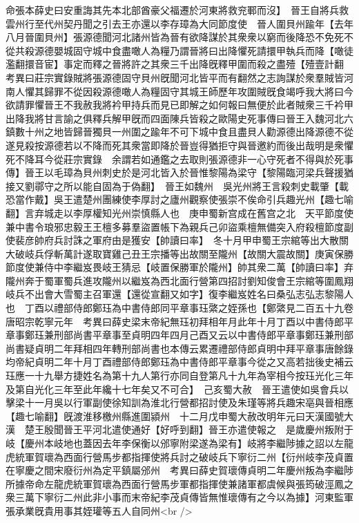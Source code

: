 命張本薛史曰安重誨其先本北部酋豪父福遷於河東將救兖鄆而沒】　晉王自將兵救雲州行至代州契丹聞之引去王亦還以李存璋為大同節度使　晉人圍貝州踰年【去年八月晉圍貝州】張源德聞河北諸州皆為晉有欲降謀於其衆衆以窮而後降恐不免死不從共殺源德嬰城固守城中食盡噉人為糧乃謂晉將曰出降懼死請擐甲執兵而降【噉徒濫翻擐音宦】事定而釋之晉將許之其衆三千出降旣釋甲圍而殺之盡殪【殪壹計翻　考異曰莊宗實錄賊將張源德固守貝州旣聞河北皆平而有翻然之志詢謀於衆羣賊皆河南人懼其歸罪不從因殺源德噉人為糧固守其城王師歷年攻圍賊旣食竭呼我大將曰今欲請罪懼晉王不我赦我將衿甲持兵而見已即解之如何報曰無便於此者賊衆三千衿甲出降我將甘言諭之俱釋兵解甲旣而四面陳兵皆殺之歐陽史死事傳曰晉王入魏河北六鎮數十州之地皆歸晉獨貝一州圍之踰年不可下城中食且盡貝人勸源德出降源德不從遂見殺按源德若以不降而死其衆當即降於晉豈得猶拒守與晉邀約而後出哉明是衆懼死不降耳今從莊宗實錄　余謂若如通鑑之去取則張源德非一心守死者不得與於死事傳】晉王以毛璋為貝州刺史於是河北皆入於晉惟黎陽為梁守【黎陽臨河梁兵聲援猶接又劉鄩守之所以能自固為于偽翻】　晉王如魏州　吳光州將王言殺刺史載肇【載恐當作戴】吳王遣楚州團練使李厚討之廬州觀察使張崇不俟命引兵趣光州【趣七喻翻】言弃城走以李厚權知光州崇慎縣人也　庚申蜀新宫成在舊宫之北　天平節度使兼中書令琅邪忠毅王王檀多募羣盜置帳下為親兵己卯盜乘檀無備突入府殺檀節度副使裴彦帥府兵討誅之軍府由是獲安【帥讀曰率】　冬十月甲申蜀王宗綰等出大散關大破岐兵俘斬萬計遂取寶雞己丑王宗播等出故關至隴州【故關大震故關】庚寅保勝節度使兼侍中李繼岌畏岐王猜忌【岐置保勝軍於隴州】帥其衆二萬【帥讀曰率】弃隴州奔于蜀軍蜀兵進攻隴州以繼岌為西北面行營第四招討劉知俊會王宗綰等圍鳳翔岐兵不出會大雪蜀主召軍還【還從宣翻又如字】復李繼岌姓名曰桑弘志弘志黎陽人也　丁酉以禮部侍郎鄭珏為中書侍郎同平章事珏綮之姪孫也【鄭綮見二百五十九卷唐昭宗乾寧元年　考異曰薛史梁末帝紀無珏初拜相年月此年十月丁酉以中書侍郎平章事鄭珏兼刑部尚書平章事至貞明四年四月己酉又云以中書侍郎平章事鄭珏兼刑部尚書疑貞明二年拜相四年轉刑部尚書也本傳云累遷禮部侍郎貞明中拜平章事唐餘錄均帝紀貞明二年十月丁酉禮部侍郎鄭珏為中書侍郎平章事今從之又高若拙後史補云珏應一十九舉方捷姓名為第十九人第行亦同自登第凡十九年為宰相今按珏光化三年及第自光化三年至此年纔十七年矣又不可合】　己亥蜀大赦　晉王遣使如吳會兵以擊梁十一月吳以行軍副使徐知訓為淮北行營都招討使及朱瑾等將兵趣宋亳與晉相應【趣七喻翻】旣渡淮移檄州縣進圍潁州　十二月戊申蜀大赦改明年元曰天漢國號大漢　楚王殷聞晉王平河北遣使通好【好呼到翻】晉王亦遣使報之　是歲慶州叛附于岐【慶州本岐地也蓋因去年李保衡以邠寧附梁遂為梁有】岐將李繼陟據之詔以左龍虎統軍賀瓌為西面行營馬步都指揮使將兵討之破岐兵下寧衍二州【衍州岐李茂貞置在寧慶之間宋廢衍州為定平鎮屬邠州　考異曰薛史賀瓌傳貞明二年慶州叛為李繼陟所據帝命左龍虎統軍賀瓌為西面行營馬步軍都指揮使兼諸軍都虞候與張筠破涇鳳之衆三萬下寧衍二州此非小事而末帝紀李茂貞傳皆無惟瓌傳有之今以為據】河東監軍張承業旣貴用事其姪瓘等五人自同州<br />
